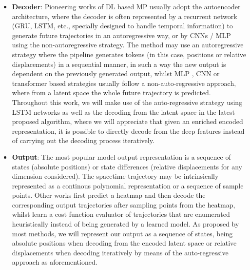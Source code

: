 \begin{itemize}
	\item \textbf{Decoder}: Pioneering works of DL based MP usually adopt the autoencoder architecture, where the decoder is often represented by a recurrent network (\ac{GRU}, \ac{LSTM}, etc., specially designed to handle temporal information) to generate future trajectories in an autoregressive way, or by CNNs \cite{gilles2021home} \cite{gilles2022gohome} / MLP \cite{liang2020learning} \cite{schmidt2022crat} using the non-autoregressive strategy. The method may use an autoregressive strategy where the pipeline generates tokens (in this case, positions or relative displacements) in a sequential manner, in such a way the new output is dependent on the previously generated output, whilst MLP \cite{schmidt2022crat}, CNN \cite{gilles2021home} or transformer \cite{ngiam2022scene} based strategies usually follow a non-auto-regressive approach, where from a latent space the whole future trajectory is predicted. Throughout this work, we will make use of the auto-regressive strategy using \ac{LSTM} networks as well as the decoding from the latent space in the latest proposed algorithm, where we will appreciate that given an enriched encoded representation, it is possible to directly decode from the deep features instead of carrying out the decoding process iteratively.
	
	\item \textbf{Output}: The most popular model output representation is a sequence of states (absolute positions) or state differences (relative displacements for any dimension considered). The spacetime trajectory may be intrinsically represented as a continous polynomial representation or a sequence of sample points. Other works \cite{gilles2021home} \cite{gilles2022gohome} first predict a heatmap and then decode the corresponding output trajectories after sampling points from the heatmap, whilst \cite{casas2021mp3} \cite{zeng2019end} learn a cost function evaluator of trajectories that are enumerated heuristically instead of being generated by a learned model. As proposed by most methods, we will represent our output as a sequence of states, being absolute positions when decoding from the encoded latent space or relative displacements when decoding iteratively by means of the auto-regressive approach as aforementioned.
	

\end{itemize}
